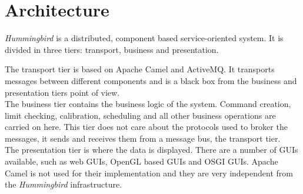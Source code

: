 \section{Architecture}

\emph{Hummingbird} is a distributed, component based service-oriented system. It is divided in three tiers: transport, business and presentation.

The transport tier is based on Apache Camel and ActiveMQ. It transports messages between different components  and is a black box from the business and presentation tiers point of view.\\

The business tier contains the business logic of the system. Command creation, limit checking, calibration, scheduling and all other business operations are carried on here. This tier does not care about the protocols used to broker the messages, it sends and receives them from a message bus, the transport tier.\\

The presentation tier is where the data is displayed. There are a number of GUIs available, such as web GUIs, OpenGL based GUIs and OSGI GUIs. Apache Camel is not used for their implementation and they are very independent from the \emph{Hummingbird} infrastructure.

 

\newpage